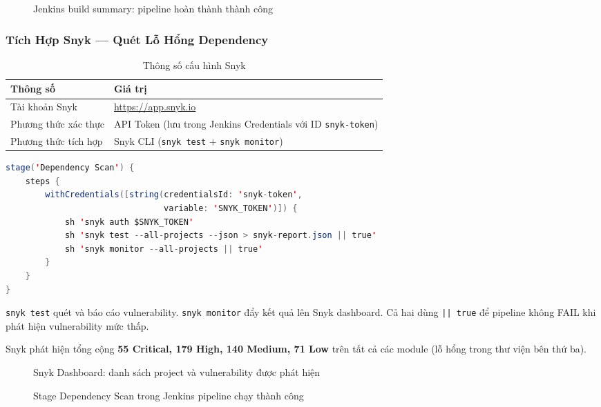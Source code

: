 \begin{figure}[H]
\centering
{}
\caption{Jenkins build summary: pipeline hoàn thành thành công}
\end{figure}

\subsubsection{Tích Hợp Snyk --- Quét Lỗ Hổng Dependency}

\begin{table}[H]
\centering
\caption{Thông số cấu hình Snyk}
\begin{tabular}{|l|p{9cm}|}
\hline
\textbf{Thông số} & \textbf{Giá trị} \\
\hline
Tài khoản Snyk & \url{https://app.snyk.io} \\
\hline
Phương thức xác thực & API Token (lưu trong Jenkins Credentials với ID \texttt{snyk-token}) \\
\hline
Phương thức tích hợp & Snyk CLI (\texttt{snyk test} + \texttt{snyk monitor}) \\
\hline
\end{tabular}
\end{table}

\begin{lstlisting}[language=Java, caption={Stage Dependency Scan trong Jenkinsfile}]
stage('Dependency Scan') {
    steps {
        withCredentials([string(credentialsId: 'snyk-token',
                                variable: 'SNYK_TOKEN')]) {
            sh 'snyk auth $SNYK_TOKEN'
            sh 'snyk test --all-projects --json > snyk-report.json || true'
            sh 'snyk monitor --all-projects || true'
        }
    }
}
\end{lstlisting}

\texttt{snyk test} quét và báo cáo vulnerability. \texttt{snyk monitor} đẩy kết quả lên Snyk dashboard. Cả hai dùng \texttt{|| true} để pipeline không FAIL khi phát hiện vulnerability mức thấp.

Snyk phát hiện tổng cộng \textbf{55 Critical, 179 High, 140 Medium, 71 Low} trên tất cả các module (lỗ hổng trong thư viện bên thứ ba).

\begin{figure}[H]
\centering
{}
\caption{Snyk Dashboard: danh sách project và vulnerability được phát hiện}
\end{figure}

\begin{figure}[H]
\centering
{}
\caption{Stage Dependency Scan trong Jenkins pipeline chạy thành công}
\end{figure}

